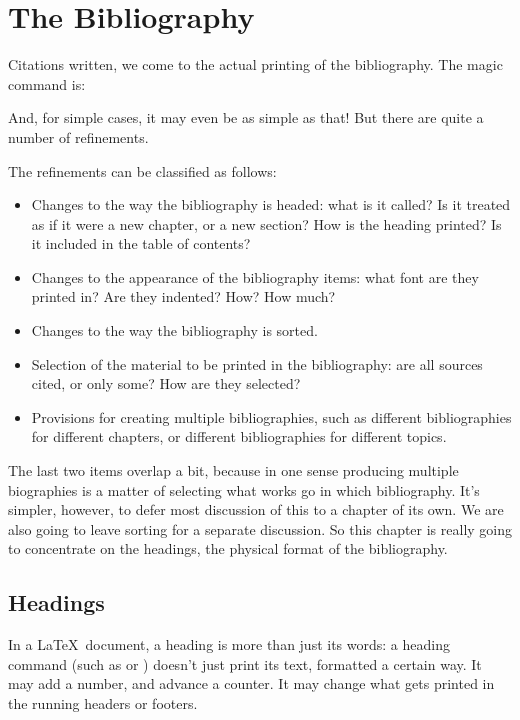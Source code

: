 \chapter{The Bibliography}

Citations written, we come to the actual printing of the
bibliography. The magic command is:
\begin{center}
\end{center}
And, for simple cases, it may even be as simple as that! But there are
quite a number of refinements.

The refinements can be classified as follows:
\begin{itemize}
\item Changes to the way the bibliography is headed: what is it
  called? Is it treated as if it were a new chapter, or a new section?
  How is the heading printed? Is it included in the table of contents?
\item Changes to the appearance of the bibliography items: what font
  are they printed in? Are they indented? How? How much?
\item Changes to the way the bibliography is sorted.
\item Selection of the material to be printed in the bibliography: are
  all sources cited, or only some? How are they selected?
\item Provisions for creating multiple bibliographies, such as
  different bibliographies for different chapters, or different
  bibliographies for different topics.
\end{itemize}
The last two items overlap a bit, because in one sense producing
multiple biographies is a matter of selecting what works go in which
bibliography. It's simpler, however, to defer most discussion of this
to a chapter of its own. We are
also going to leave sorting for a separate discussion. So this chapter
is really going to concentrate on the headings, the physical format of
the bibliography.

\section{Headings}

In a \LaTeX\ document, a heading is more than just its words: a
heading command (such as  or ) doesn't just
print its text, formatted a certain way. It may add a number, and
advance a counter. It may change what gets printed in the running
headers or footers.

